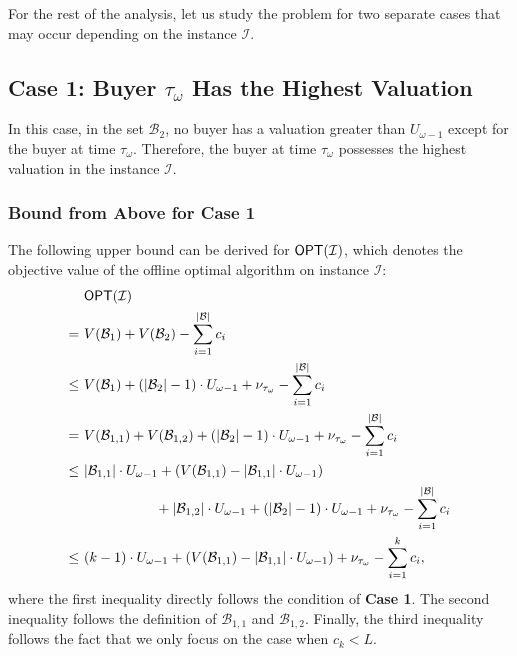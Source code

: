 For the rest of the analysis, let us study the problem for two separate cases that may occur depending on the instance $\mathcal{I}$. 



\subsection{Case 1: Buyer $ \tau_{\omega}$ Has the Highest Valuation}
In this case, in the set $\mathcal{B}_{2}$, no buyer has a valuation greater than $U_{\omega-1}$ except for the buyer at time $\tau_{\omega}$. Therefore, the buyer at time $\tau_{\omega}$ possesses the highest valuation in the instance $\mathcal{I}$.

\subsubsection{Bound \OPT from Above  for Case 1}
The following upper bound can be derived for $\textsf{OPT}(\mathcal{I})$, which denotes the objective value of the offline optimal algorithm on instance $\mathcal{I}$:
\begin{align*}
    & \textsf{OPT}(\mathcal{I}) \\
    =\ & V(\mathcal{B}_{1} ) + V(\mathcal{B}_{2} ) - \sum_{i=1}^{|\mathcal{B}|} c_{i}\\
    \leq\ &  V(\mathcal{B}_{1} ) + (|\mathcal{B}_{2}|-1) \cdot U_{\omega-1} + \nu_{\tau_{\omega}} - \sum_{i=1}^{|\mathcal{B}|} c_{i} \\
    =\ &  V(\mathcal{B}_{1,1}) + V(\mathcal{B}_{1,2}) + (|\mathcal{B}_{2}|-1)  \cdot U_{\omega-1} + \nu_{\tau_{\omega}} - \sum_{i=1}^{|\mathcal{B}|} c_{i} \\
    \leq\ &   |\mathcal{B}_{1,1}| \cdot U_{\omega-1} + (V(\mathcal{B}_{1,1}) - |\mathcal{B}_{1,1}| \cdot U_{\omega-1} )   \\
    & \hspace{1.8cm} + |\mathcal{B}_{1,2}| \cdot U_{\omega-1} + (|\mathcal{B}_{2}|-1) \cdot U_{\omega-1}   + \nu_{\tau_{\omega}} - \sum_{i=1}^{|\mathcal{B}|} c_{i} \\
    \leq\ &  (k-1) \cdot U_{\omega-1} + (V(\mathcal{B}_{1,1}) - |\mathcal{B}_{1,1}| \cdot U_{\omega-1} )  + \nu_{\tau_{\omega}} - \sum_{i=1}^{k} c_{i},
\end{align*}
where the first inequality directly follows the condition of \textbf{Case 1}. The second inequality follows the definition of $\mathcal{B}_{1,1}$ and $\mathcal{B}_{1,2}$. Finally, the third inequality follows the fact that we only focus on the case when $c_{k} < L$.

